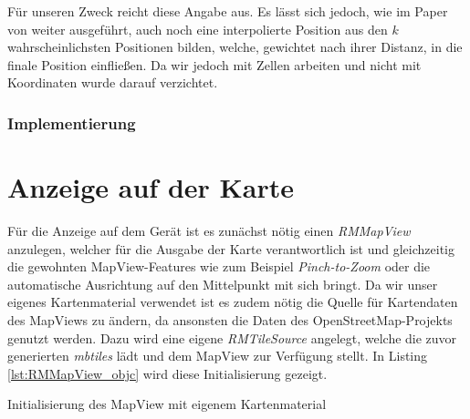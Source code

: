 Für unseren Zweck reicht diese Angabe aus. Es lässt sich jedoch, wie im Paper von \citet{wifiFingerprintProbability} weiter ausgeführt, auch noch eine interpolierte Position aus den $k$ wahrscheinlichsten Positionen bilden, welche, gewichtet nach ihrer Distanz, in die finale Position einfließen. Da wir jedoch mit Zellen arbeiten und nicht mit Koordinaten wurde darauf verzichtet. 

\subsubsection{Implementierung}
\label{sec:implementation:fingerprinting:positioning:probability:implementiation}

\section{Anzeige auf der Karte}
\label{sec:implementation:map}

Für die Anzeige auf dem Gerät ist es zunächst nötig einen \emph{RMMapView} anzulegen, welcher für die Ausgabe der Karte verantwortlich ist und gleichzeitig die gewohnten MapView-Features wie zum Beispiel \emph{Pinch-to-Zoom} oder die automatische Ausrichtung auf den Mittelpunkt mit sich bringt.
Da wir unser eigenes Kartenmaterial verwendet ist es zudem nötig die Quelle für Kartendaten des MapViews zu ändern, da ansonsten die Daten des OpenStreetMap-Projekts genutzt werden. Dazu wird eine eigene \emph{RMTileSource} angelegt, welche die zuvor generierten \emph{mbtiles} lädt und dem MapView zur Verfügung stellt. 
In Listing \ref{lst:RMMapView_objc} wird diese Initialisierung gezeigt.
\begin{listing}[htb!]
    \caption{Initialisierung des MapView mit eigenem Kartenmaterial}
	\label{lst:RMMapView_objc}
\end{listing}